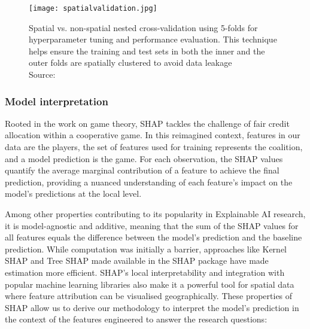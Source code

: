 \begin{figure}[!ht]
    \centering
    \texttt{[image: spatialvalidation.jpg]}
    \captionsetup{justification=centering}
    \caption{Spatial vs. non-spatial nested cross-validation using 5-folds for hyperparameter tuning and performance evaluation. This technique helps ensure the training and test sets in both the inner and the outer folds are spatially clustered to avoid data leakage\\ Source: \citet{schratzPerformanceEvaluationHyperparameter2018}}
    \label{fig:spatialnested}
\end{figure}

\subsubsection*{Model interpretation}

Rooted in the work on game theory, SHAP tackles the challenge of fair credit allocation within a cooperative game. In this reimagined context, features in our data are the players, the set of features used for training represents the coalition, and a model prediction is the game. For each observation, the SHAP values quantify the average marginal contribution of a feature to achieve the final prediction, providing a nuanced understanding of each feature's impact on the model's predictions at the local level.

Among other properties contributing to its popularity in Explainable AI research, it is model-agnostic and additive, meaning that the sum of the SHAP values for all features equals the difference between the model's prediction and the baseline prediction. While computation was initially a barrier, approaches like Kernel SHAP and Tree SHAP made available in the SHAP package have made estimation more efficient. SHAP's local interpretability and integration with popular machine learning libraries also make it a powerful tool for spatial data where feature attribution can be visualised geographically. These properties of SHAP allow us to derive our methodology to interpret the model's prediction in the context of the features engineered to answer the research questions:

